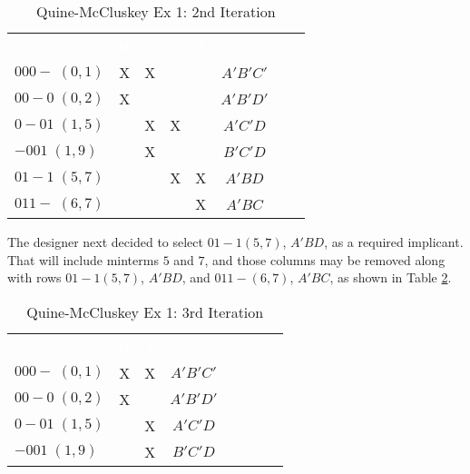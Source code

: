 \begin{table}[H]
	\sffamily
	\newcommand{\head}[1]{\textcolor{white}{\textbf{#1}}}		
	\begin{center}
		\begin{adjustbox}{max width=\textwidth}
			\begin{tabular}{lccccccc} 
				\rowcolor{black!75}
				& \head{0} & \head{1} & \head{5}
				& \head{7} & \\
				$ 000-\;(0,1) $       & X & X &   &   & $ A'B'C' $ \\
				$ 00-0\;(0,2) $       & X &   &   &   & $ A'B'D' $ \\
				$ 0-01\;(1,5) $       &   & X & X &   & $ A'C'D $ \\
				$ -001\;(1,9) $       &   & X &   &   & $ B'C'D $ \\
				$ 01-1\;(5,7) $       &   &   & X & X & $ A'BD $ \\
				$ 011-\;(6,7) $       &   &   &   & X & $ A'BC $ \\
				\hline
			\end{tabular}
		\end{adjustbox}
	\end{center}
	\caption{Quine-McCluskey Ex 1: 2nd Iteration}
  \label{ASM:tab:qm_ex_1_2nd_iteration}
\end{table}

The designer next decided to select $ 01-1 (5,7) $, $ A'BD $, as a required implicant. That will include minterms $ 5 $ and $ 7 $, and those columns may be removed along with rows $ 01-1 (5,7) $, $ A'BD $, and $ 011- (6,7) $, $ A'BC $, as shown in Table \ref{ASM:tab:qm_ex_1_3rd_iteration}.

\begin{table}[H]
	\sffamily
	\newcommand{\head}[1]{\textcolor{white}{\textbf{#1}}}		
	\begin{center}
		\begin{adjustbox}{max width=\textwidth}
			\begin{tabular}{lccccccc} 
				\rowcolor{black!75}
				& \head{0} & \head{1} & \\
				$ 000-\;(0,1) $       & X & X & $ A'B'C' $ \\
				$ 00-0\;(0,2) $       & X &   & $ A'B'D' $ \\
				$ 0-01\;(1,5) $       &   & X & $ A'C'D $ \\
				$ -001\;(1,9) $       &   & X & $ B'C'D $ \\
				\hline
			\end{tabular}
		\end{adjustbox}
	\end{center}
	\caption{Quine-McCluskey Ex 1: 3rd Iteration}
  \label{ASM:tab:qm_ex_1_3rd_iteration}
\end{table}

